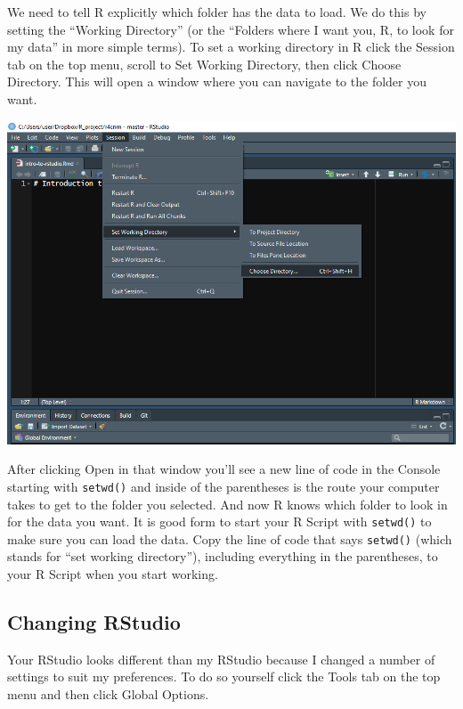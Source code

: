 \documentclass[
  12pt,
  openany]{book}
\begin{document}
We need to tell R explicitly which folder has the data to load. We do this by setting the ``Working Directory'' (or the ``Folders where I want you, R, to look for my data'' in more simple terms). To set a working directory in R click the Session tab on the top menu, scroll to Set Working Directory, then click Choose Directory. This will open a window where you can navigate to the folder you want.

\includegraphics{images/rstudio_3.PNG}

After clicking Open in that window you'll see a new line of code in the Console starting with \texttt{setwd()} and inside of the parentheses is the route your computer takes to get to the folder you selected. And now R knows which folder to look in for the data you want. It is good form to start your R Script with \texttt{setwd()} to make sure you can load the data. Copy the line of code that says \texttt{setwd()} (which stands for ``set working directory''), including everything in the parentheses, to your R Script when you start working.

\hypertarget{changing-rstudio}{%
\subsection{Changing RStudio}\label{changing-rstudio}}

Your RStudio looks different than my RStudio because I changed a number of settings to suit my preferences. To do so yourself click the Tools tab on the top menu and then click Global Options.
\end{document}
